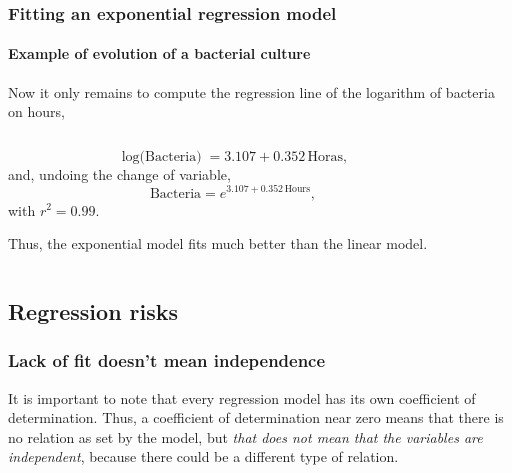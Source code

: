 \begin{frame}
\frametitle{Fitting an exponential regression model}
\framesubtitle{Example of evolution of a bacterial culture}
Now it only remains to compute the regression line of the logarithm of bacteria on hours,
\begin{columns}
\begin{column}{0.45\textwidth}
\[
\mbox{$\log$(Bacteria)} = 3.107 + 0.352\, \mbox{Horas},
\]
and, undoing the change of variable, 
\[
\mbox{Bacteria} = e^{3.107+0.352\,\mbox{Hours}},
\]
with $r^2=0.99$.

Thus, the exponential model fits much better than the linear model. 
\end{column}
\begin{column}{0.55\textwidth}
\begin{center}
\end{center}
\end{column}
\end{columns}
\end{frame}

\subsection{Regression risks}

\begin{frame}
\frametitle{Lack of fit doesn't mean independence}
It is important to note that every regression model has its own coefficient of determination. Thus, a coefficient of determination near zero means that there is no relation as set by the model, but \emph{that does not mean that the variables are independent}, because there could be a different type of relation.
\begin{center}
\resizebox{0.49\textwidth}{!}{}
\resizebox{0.49\textwidth}{!}{}
\end{center}
\end{frame}


